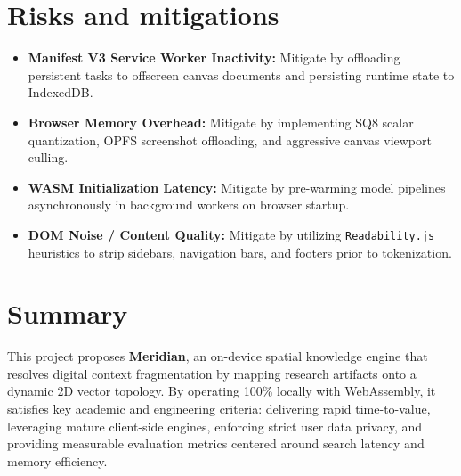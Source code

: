\documentclass[11pt,a4paper]{article}
\begin{document}
\section{Risks and mitigations}
\begin{itemize}[leftmargin=0.7cm]
    \item \textbf{Manifest V3 Service Worker Inactivity:} Mitigate by offloading persistent tasks to offscreen canvas documents and persisting runtime state to IndexedDB.
    \item \textbf{Browser Memory Overhead:} Mitigate by implementing SQ8 scalar quantization, OPFS screenshot offloading, and aggressive canvas viewport culling.
    \item \textbf{WASM Initialization Latency:} Mitigate by pre-warming model pipelines asynchronously in background workers on browser startup.
    \item \textbf{DOM Noise / Content Quality:} Mitigate by utilizing \texttt{Readability.js} heuristics to strip sidebars, navigation bars, and footers prior to tokenization.
\end{itemize}

\section{Summary}
This project proposes \textbf{Meridian}, an on-device spatial knowledge engine that resolves digital context fragmentation by mapping research artifacts onto a dynamic 2D vector topology. By operating 100\% locally with WebAssembly, it satisfies key academic and engineering criteria: delivering rapid time-to-value, leveraging mature client-side engines, enforcing strict user data privacy, and providing measurable evaluation metrics centered around search latency and memory efficiency.
\end{document}
